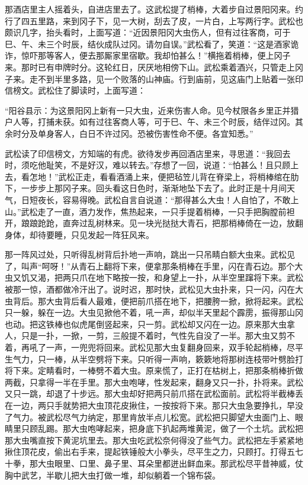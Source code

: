 \documentclass[12pt,UTF-8,openany]{ctexbook}
\begin{document}
\begin{large}
    那酒店里主人摇着头，自进店里去了。这武松提了梢棒，大着步自过景阳冈来。约行了四五里路，来到冈子下，见一大树，刮去了皮，一片白，上写两行字。武松也颇识几字，抬头看时，上面写道：“近因景阳冈大虫伤人，但有过往客商，可于巳、午、未三个时辰，结伙成队过冈。请勿自误。”武松看了，笑道：“这是酒家诡诈，惊吓那等客人，便去那厮家里宿歇。我却怕甚么！”横拖着梢棒，便上冈子来。那时已有申牌时分。这轮红日，厌厌地相傍下山。武松乘着酒兴，只管走上冈子来。走不到半里多路，见一个败落的山神庙。行到庙前，见这庙门上贴着一张印信榜文。武松住了脚读时，上面写道：
    
    “阳谷县示：为这景阳冈上新有一只大虫，近来伤害人命。见今杖限各乡里正并猎户人等，打捕未获。如有过往客商人等，可于巳、午、未三个时辰，结伴过冈。其余时分及单身客人，白日不许过冈。恐被伤害性命不便。各宜知悉。”
    
    武松读了印信榜文，方知端的有虎。欲待发步再回酒店里来，寻思道：“我回去时，须吃他耻笑，不是好汉，难以转去。”存想了一回，说道：“怕甚么！且只顾上去，看怎地！”武松正走，看看酒涌上来，便把毡笠儿背在脊梁上，将梢棒绾在肋下，一步步上那冈子来。回头看这日色时，渐渐地坠下去了。此时正是十月间天气，日短夜长，容易得晚。武松自言自说道：“那得甚么大虫！人自怕了，不敢上山。”武松走了一直，酒力发作，焦热起来，一只手提着梢棒，一只手把胸膛前袒开，踉踉跄跄，直奔过乱树林来。见一块光挞挞大青石，把那梢棒倚在一边，放翻身体，却待要睡，只见发起一阵狂风来。
    
    那一阵风过处，只听得乱树背后扑地一声响，跳出一只吊睛白额大虫来。武松见了，叫声“呵呀！”从青石上翻将下来，便拿那条梢棒在手里，闪在青石边。那个大虫又饥又渴，把两只爪在地下略按一按，和身望上一扑，从半空里蹿将下来。武松被那一惊，酒都做冷汗出了。说时迟，那时快，武松见大虫扑来，只一闪，闪在大虫背后。那大虫背后看人最难，便把前爪搭在地下，把腰胯一掀，掀将起来。武松只一躲，躲在一边。大虫见掀他不着，吼一声，却似半天里起个霹雳，振得那山冈也动。把这铁棒也似虎尾倒竖起来，只一剪。武松却又闪在一边。原来那大虫拿人，只是一扑，一掀，一剪，三般提不着时，气性先自没了一半。那大虫又剪不着，再吼了一声，一兜兜将回来。武松见那大虫复翻身回来，双手轮起梢棒，尽平生气力，只一棒，从半空劈将下来。只听得一声响，簌簌地将那树连枝带叶劈脸打将下来。定睛看时，一棒劈不着大虫。原来慌了，正打在枯树上，把那条梢棒折做两截，只拿得一半在手里。那大虫咆哮，性发起来，翻身又只一扑，扑将来。武松又只一跳，却退了十步远。那大虫却好把两只前爪搭在武松面前。武松将半截棒丢在一边，两只手就势把大虫顶花皮揪住，一按按将下来。那只大虫急要挣扎，早没了气力。被武松尽气力纳定，那里肯放半点儿松宽。武松把只脚望大虫面门上、眼睛里只顾乱踢。那大虫咆哮起来，把身底下扒起两堆黄泥，做了一个土坑。武松把那大虫嘴直按下黄泥坑里去。那大虫吃武松奈何得没了些气力。武松把左手紧紧地揪住顶花皮，偷出右手来，提起铁锤般大小拳头，尽平生之力，只顾打。打得五七十拳，那大虫眼里、口里、鼻子里、耳朵里都迸出鲜血来。那武松尽平昔神威，仗胸中武艺，半歇儿把大虫打做一堆，却似躺着一个锦布袋。
    

\end{large}
\end{document}
